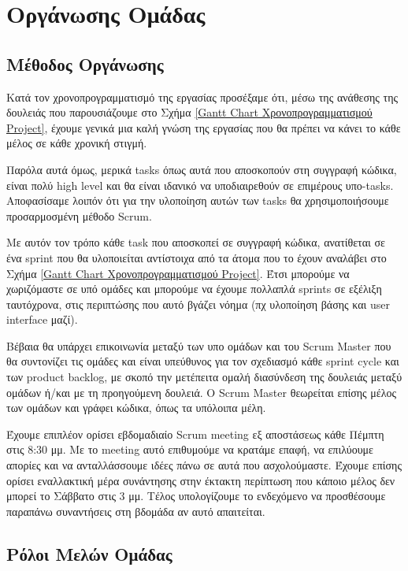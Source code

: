 \documentclass[12pt,a4paper]{article}
\begin{document}
\section{Οργάνωσης Ομάδας}

\subsection{Μέθοδος Οργάνωσης}
Κατά τον χρονοπρογραμματισμό της εργασίας προσέξαμε ότι, μέσω της ανάθεσης της δουλειάς που παρουσιάζουμε στο Σχήμα \ref{Gantt Chart Χρονοπρογραμματισμού Project}, έχουμε γενικά μια καλή γνώση της εργασίας που θα πρέπει να κάνει το κάθε μέλος σε κάθε χρονική στιγμή. 

Παρόλα αυτά όμως, μερικά tasks όπως αυτά που αποσκοπούν στη συγγραφή κώδικα, είναι πολύ high level και θα είναι ιδανικό να υποδιαιρεθούν σε επιμέρους υπο-tasks. Αποφασίσαμε λοιπόν ότι για την υλοποίηση αυτών των tasks θα χρησιμοποιήσουμε προσαρμοσμένη μέθοδο Scrum.

Με αυτόν τον τρόπο κάθε task που αποσκοπεί σε συγγραφή κώδικα, ανατίθεται σε ένα sprint που θα υλοποιείται αντίστοιχα από τα άτομα που το έχουν αναλάβει στο Σχήμα \ref{Gantt Chart Χρονοπρογραμματισμού Project}. Έτσι μπορούμε να χωριζόμαστε σε υπό ομάδες και μπορούμε να έχουμε πολλαπλά sprints σε εξέλιξη ταυτόχρονα, στις περιπτώσης που αυτό βγάζει νόημα (πχ υλοποίηση βάσης και user interface μαζί).

Βέβαια θα υπάρχει επικοινωνία μεταξύ των υπο ομάδων και του Scrum Master που θα συντονίζει τις ομάδες και είναι υπεύθυνος για τον σχεδιασμό κάθε sprint cycle και των product backlog, με σκοπό την μετέπειτα ομαλή διασύνδεση της δουλειάς μεταξύ ομάδων ή/και με τη προηγούμενη δουλειά. Ο Scrum Master θεωρείται επίσης μέλος των ομάδων και γράφει κώδικα, όπως τα υπόλοιπα μέλη.

Έχουμε επιπλέον ορίσει εβδομαδιαίο Scrum meeting εξ αποστάσεως κάθε Πέμπτη στις 8:30 μμ. Με το meeting αυτό επιθυμούμε να κρατάμε επαφή, να επιλύουμε απορίες και να ανταλλάσσουμε ιδέες πάνω σε αυτά που ασχολούμαστε. Έχουμε επίσης ορίσει εναλλακτική μέρα συνάντησης στην έκτακτη περίπτωση που κάποιο μέλος δεν μπορεί το Σάββατο στις 3 μμ. Τέλος υπολογίζουμε το ενδεχόμενο να προσθέσουμε παραπάνω συναντήσεις στη βδομάδα αν αυτό απαιτείται.

\subsection{Ρόλοι Μελών Ομάδας}
\end{document}
